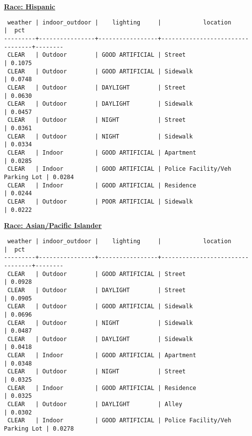 \documentclass[10pt]{article}
\begin{document}
\underline{\textbf{Race: Hispanic}}
\begin{verbatim}
 weather | indoor_outdoor |    lighting     |            location             |  pct
---------+----------------+-----------------+---------------------------------+--------
 CLEAR   | Outdoor        | GOOD ARTIFICIAL | Street                          | 0.1075
 CLEAR   | Outdoor        | GOOD ARTIFICIAL | Sidewalk                        | 0.0748
 CLEAR   | Outdoor        | DAYLIGHT        | Street                          | 0.0630
 CLEAR   | Outdoor        | DAYLIGHT        | Sidewalk                        | 0.0457
 CLEAR   | Outdoor        | NIGHT           | Street                          | 0.0361
 CLEAR   | Outdoor        | NIGHT           | Sidewalk                        | 0.0334
 CLEAR   | Indoor         | GOOD ARTIFICIAL | Apartment                       | 0.0285
 CLEAR   | Indoor         | GOOD ARTIFICIAL | Police Facility/Veh Parking Lot | 0.0284
 CLEAR   | Indoor         | GOOD ARTIFICIAL | Residence                       | 0.0244
 CLEAR   | Outdoor        | POOR ARTIFICIAL | Sidewalk                        | 0.0222
\end{verbatim}

\underline{\textbf{Race: Asian/Pacific Islander}}
\begin{verbatim}
 weather | indoor_outdoor |    lighting     |            location             |  pct
---------+----------------+-----------------+---------------------------------+--------
 CLEAR   | Outdoor        | GOOD ARTIFICIAL | Street                          | 0.0928
 CLEAR   | Outdoor        | DAYLIGHT        | Street                          | 0.0905
 CLEAR   | Outdoor        | GOOD ARTIFICIAL | Sidewalk                        | 0.0696
 CLEAR   | Outdoor        | NIGHT           | Sidewalk                        | 0.0487
 CLEAR   | Outdoor        | DAYLIGHT        | Sidewalk                        | 0.0418
 CLEAR   | Indoor         | GOOD ARTIFICIAL | Apartment                       | 0.0348
 CLEAR   | Outdoor        | NIGHT           | Street                          | 0.0325
 CLEAR   | Indoor         | GOOD ARTIFICIAL | Residence                       | 0.0325
 CLEAR   | Outdoor        | DAYLIGHT        | Alley                           | 0.0302
 CLEAR   | Indoor         | GOOD ARTIFICIAL | Police Facility/Veh Parking Lot | 0.0278
\end{verbatim}
\end{document}
